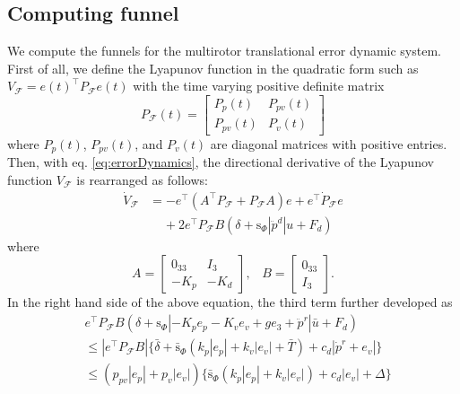 \documentclass[letterpaper, 10 pt, conference]{ieeeconf}  %
\begin{document}
\subsection{Computing funnel}
We compute the funnels for the multirotor translational error dynamic system.
First of all, 
we define the Lyapunov function in the quadratic form such as $V_\mathcal{F} = e(t)^\top P_\mathcal{F} e(t)$ with the time varying positive definite matrix
\begin{equation}
P_\mathcal{F}(t) = \left[
\begin{array}{cc}
P_p(t) & P_{pv}(t) \\
P_{pv}(t) & P_v(t)
\end{array}
\right] \label{eq:funnelP}
\end{equation}
where $P_p(t)$, $P_{pv}(t)$, and $P_v(t)$ are diagonal matrices with positive entries.
Then, with eq. \eqref{eq:errorDynamics}, the directional derivative of the Lyapunov function $V_\mathcal{F}$ is rearranged as follows: 
\begin{align}
\dot{V}_\mathcal{F} &= -e^\top ( A^\top P_\mathcal{F} + P_\mathcal{F}A) e + e^\top \dot{P}_\mathcal{F}e \nonumber \\
&\;\;\;\;+2e^\top P_\mathcal{F} B(\delta+\text{s}_\Phi|\ddot{p}^d|{u}+F_d) \nonumber
\end{align}
where
\begin{equation}
A = \left[
\begin{array}{rr}
0_{33} & I_3 \\ -K_p & -K_d 
\end{array}
\right],\;\;\;B = \left[
\begin{array}{r}
0_{33} \\ I_3
\end{array}
\right].\nonumber 
\end{equation}
In the right hand side of the above equation, the third term further developed as
\begin{align}
&e^\top P_\mathcal{F} B(\delta+\text{s}_\Phi|-K_p e_p -K_v e_v + ge_3 + \ddot{p}^r|\bar{u}+F_d) \nonumber \\
&\leq |e^\top P_\mathcal{F}B|\{\bar{\delta} + \bar{\text{s}}_\Phi(k_p|e_p| + k_v|e_v| + \bar{T})+c_d|\dot{p}^r+e_v|\} \nonumber \\
&\leq (p_{pv}|e_p|+p_v|e_v|)\{\bar{\text{s}}_\Phi(k_p|e_p|+k_v|e_v|)+c_d|e_v|+\Delta\} \label{eq:normAnalysis}
\end{align}
\end{document}
